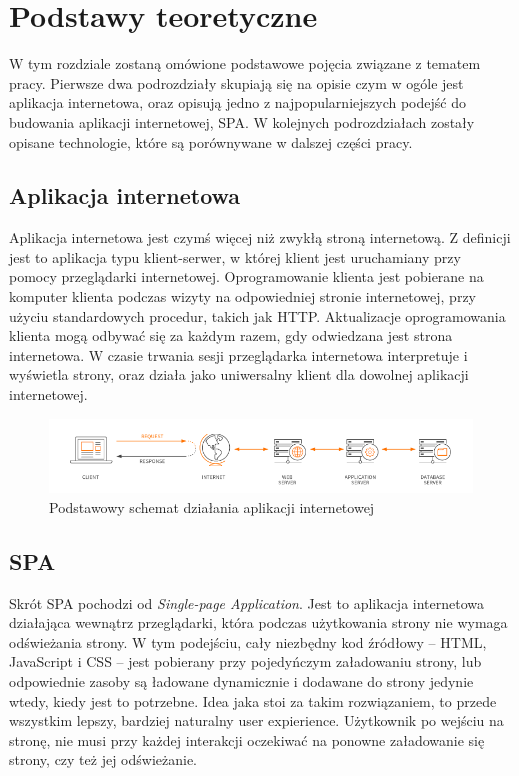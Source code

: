 \chapter{Podstawy teoretyczne} \label{chap:teoria}
W tym rozdziale zostaną omówione podstawowe pojęcia związane z tematem pracy. Pierwsze dwa podrozdziały skupiają się na opisie czym w ogóle jest aplikacja internetowa, oraz opisują jedno z najpopularniejszych podejść do budowania aplikacji internetowej, SPA. W kolejnych podrozdziałach zostały opisane technologie, które są porównywane w dalszej części pracy.
\section{Aplikacja internetowa}
Aplikacja internetowa jest czymś więcej niż zwykłą stroną internetową. Z definicji jest to aplikacja typu klient-serwer, w której klient jest uruchamiany przy pomocy przeglądarki internetowej. Oprogramowanie klienta jest pobierane na komputer klienta podczas wizyty na odpowiedniej stronie internetowej, przy użyciu standardowych procedur, takich jak HTTP. Aktualizacje oprogramowania klienta mogą odbywać się za każdym razem, gdy odwiedzana jest strona internetowa. W czasie trwania sesji przeglądarka internetowa interpretuje i wyświetla strony, oraz działa jako uniwersalny klient dla dowolnej aplikacji internetowej.
\begin{figure}[h]
	\centering
	\includegraphics[width=\textwidth]{images/how_web_application_works}
	\caption{Podstawowy schemat działania aplikacji internetowej \cite{MaxCdnWebApp}}
\end{figure}
\section{SPA}
Skrót SPA pochodzi od \textit{Single-page Application}. Jest to aplikacja internetowa działająca wewnątrz przeglądarki, która podczas użytkowania strony nie wymaga odświeżania strony. W tym podejściu, cały niezbędny kod źródłowy -- HTML, JavaScript i CSS -- jest pobierany przy pojedyńczym załadowaniu strony, lub odpowiednie zasoby są ładowane dynamicznie i dodawane do strony jedynie wtedy, kiedy jest to potrzebne. Idea jaka stoi za takim rozwiązaniem, to przede wszystkim lepszy, bardziej naturalny user expierience. Użytkownik po wejściu na stronę, nie musi przy każdej interakcji oczekiwać na ponowne załadowanie się strony, czy też jej odświeżanie.

